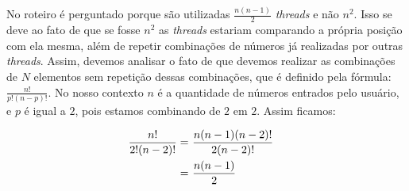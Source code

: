 No roteiro é perguntado porque são utilizadas $\frac{n(n-1)}{2}$ \emph{threads} e não $n^2$. Isso se deve ao fato de que se fosse $n^2$ as \emph{threads} estariam comparando a própria posição com ela mesma, além de repetir combinações de números já realizadas por outras \emph{threads}. Assim, devemos analisar o fato de que devemos realizar as combinações de $N$ elementos sem repetição dessas combinações, que é definido pela fórmula: $\frac{n!}{p!(n-p)!}$. No nosso contexto $n$ é a quantidade de números entrados pelo usuário, e $p$ é igual a $2$, pois estamos combinando de $2$ em $2$. Assim ficamos:

\begin{align}
	\frac{n!}{2!(n-2)!} = \ &\frac{n(n-1)(n-2)!}{2(n-2)!}& \notag \\
	= \ &\frac{n(n-1)}{2}& \label{eq:q02}
\end{align}
